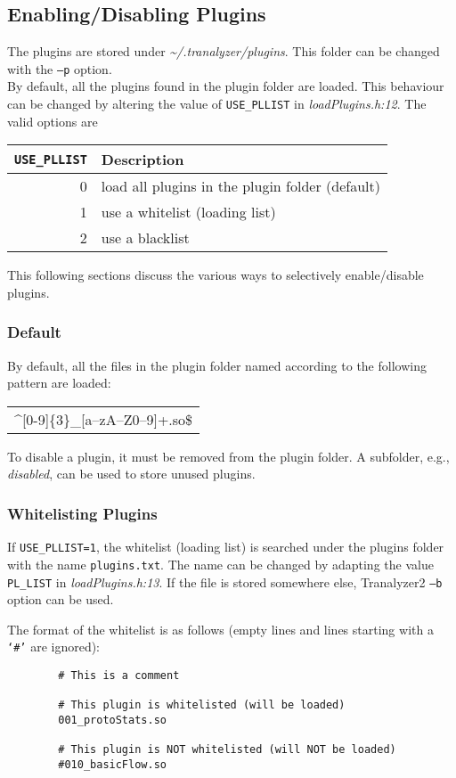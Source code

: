 \subsection{Enabling/Disabling Plugins}\label{ss:plugins}
The plugins are stored under {\em\textasciitilde{}/.tranalyzer/plugins}.
This folder can be changed with the {\tt --p} option.\\

By default, all the plugins found in the plugin folder are loaded.
This behaviour can be changed by altering the value of {\tt USE\_PLLIST} in {\em loadPlugins.h:12}. The valid options are
\begin{longtable}{rl}
    \toprule
    {\tt USE\_PLLIST} & {\bf Description}\\
    \midrule\endhead%
    0 & load all plugins in the plugin folder (default)\\ %
    1 & use a whitelist (loading list)\\
    2 & use a blacklist\\
    \bottomrule
\end{longtable}

This following sections discuss the various ways to selectively enable/disable plugins.

\subsubsection{Default}
By default, all the files in the plugin folder named according to the following pattern are loaded:\\
\begin{longtable}{>{\ttfamily}c}
    \textasciicircum[0-9]\{3\}\_[a--zA--Z0--9]+.so\$
\end{longtable}
To disable a plugin, it must be removed from the plugin folder. A subfolder, e.g., {\em disabled}, can be used to store unused plugins.

\subsubsection{Whitelisting Plugins}
If {\tt USE\_PLLIST=1}, the whitelist (loading list) is searched under the plugins folder with the name {\tt plugins.txt}.
The name can be changed by adapting the value {\tt PL\_LIST} in {\em loadPlugins.h:13}.
If the file is stored somewhere else, Tranalyzer2 {\tt --b} option can be used.

The format of the whitelist is as follows (empty lines and lines starting with a {\tt `\#'} are ignored):
\begin{verbatim}
        # This is a comment

        # This plugin is whitelisted (will be loaded)
        001_protoStats.so

        # This plugin is NOT whitelisted (will NOT be loaded)
        #010_basicFlow.so
\end{verbatim}

